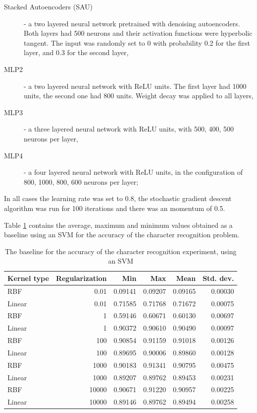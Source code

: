 \begin{description}


\item[Stacked Autoencoders (SAU)] - a two layered neural network pretrained with denoising autoencoders. Both layers had 500 neurons and their activation functions were hyperbolic tangent.  The input was randomly set to 0 with probability 0.2 for the first layer, and 0.3 for the second layer,
\item[MLP2] - a two layered neural network with ReLU units. The first layer had 1000 units, the second one had 800 units. Weight decay was applied to all layers,
\item[MLP3] - a three layered neural network with ReLU units, with 500, 400, 500 neurons per layer,
\item[MLP4] - a four layered neural network with ReLU units, in the configuration of 800, 1000, 800, 600 neurons per layer;
\end{description}

In all cases the learning rate was set to 0.8, the stochastic gradient descent algorithm was run for 100 iterations and there was an momentum of 0.5.

Table \ref{table:recog_values} contains the average, maximum and minimum values obtained as a baseline using an SVM for the accuracy of the character recognition problem.

\begin{table}[h]
\caption{The baseline for the accuracy of the character recognition experiment, using an SVM}
\label{table:recog_values}
\begin{tabular}{lrrrrr}
\toprule
Kernel type & Regularization & Min     & Max     & Mean    & Std. dev. \\ 
\midrule
RBF & 0.01 & 0.09141 & 0.09207 & 0.09165 & 0.00030 \\ 
Linear & 0.01 & 0.71585 & 0.71768 & 0.71672 & 0.00075 \\ 
RBF & 1 & 0.59146 & 0.60671 & 0.60130 & 0.00697 \\ 
Linear & 1 & 0.90372 & 0.90610 & 0.90490 & 0.00097 \\ 
RBF & 100 & 0.90854 & 0.91159 & 0.91018 & 0.00126 \\ 
Linear & 100 & 0.89695 & 0.90006 & 0.89860 & 0.00128 \\ 
RBF & 1000 & 0.90183 & 0.91341 & 0.90795 & 0.00475 \\ 
Linear & 1000 & 0.89207 & 0.89762 & 0.89453 & 0.00231 \\ 
RBF & 10000 & 0.90671 & 0.91220 & 0.90957 & 0.00225 \\ 
Linear & 10000 & 0.89146 & 0.89762 & 0.89494 & 0.00258 \\ 
\bottomrule
\end{tabular}
\end{table}


